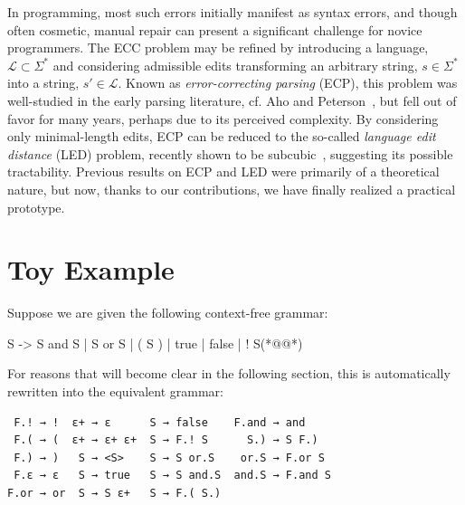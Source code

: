 \documentclass[sigplan,review,anonymous,acmsmall]{acmart}\settopmatter{printfolios=false,printccs=false,printacmref=false}
\begin{document}
    In programming, most such errors initially manifest as syntax errors, and though often cosmetic, manual repair can present a significant challenge for novice programmers. The ECC problem may be refined by introducing a language, $\mathcal{L} \subset \Sigma^*$ and considering admissible edits transforming an arbitrary string, $s \in \Sigma^*$ into a string, $s'\in\mathcal{L}$. Known as \textit{error-correcting parsing} (ECP), this problem was well-studied in the early parsing literature, cf. Aho and Peterson~\cite{aho1972minimum}, but fell out of favor for many years, perhaps due to its perceived complexity. By considering only minimal-length edits, ECP can be reduced to the so-called \textit{language edit distance} (LED) problem, recently shown to be subcubic~\cite{bringmann2019truly}, suggesting its possible tractability. Previous results on ECP and LED were primarily of a theoretical nature, but now, thanks to our contributions, we have finally realized a practical prototype.

%

    \section{Toy Example}

    Suppose we are given the following context-free grammar:

\begin{tidyinput}
S -> S and S | S or S | ( S ) | true | false | ! S(*@\caret{ }@*)
\end{tidyinput}

    \noindent For reasons that will become clear in the following section, this is automatically rewritten into the equivalent grammar:

    \begin{verbatim}
 F.! → !  ε+ → ε      S → false    F.and → and
 F.( → (  ε+ → ε+ ε+  S → F.! S      S.) → S F.)
 F.) → )   S → <S>    S → S or.S    or.S → F.or S
 F.ε → ε   S → true   S → S and.S  and.S → F.and S
F.or → or  S → S ε+   S → F.( S.)
    \end{verbatim}

%
\end{document}
